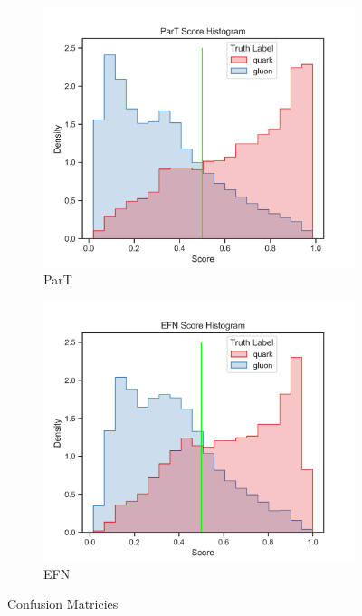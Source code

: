 \begin{figure}[!htb]
	\begin{subfigure}[t]{0.49\textwidth}
		\includegraphics[width=1\textwidth]{src/plots/results/score/part.png}
		\caption{ParT}
		\label{fig:app_score_part}
	\end{subfigure}
	\begin{subfigure}[t]{0.49\textwidth}
		\includegraphics[width=1\textwidth]{src/plots/results/score/efn.png}
		\caption{EFN}
		\label{fig:app_score_efn}
	\end{subfigure}
\caption{Confusion Matricies}
\label{fig:app_score_5-9}
\end{figure}

